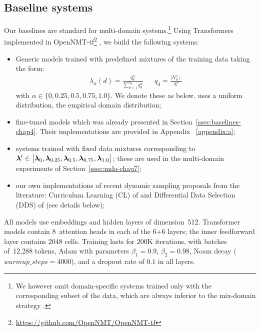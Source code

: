 \subsection{Baseline systems \label{ssec:baseline-chap7}}
Our baselines are standard for multi-domain systems.\footnote{We however omit domain-specific systems trained only with the corresponding subset of the data, which are always inferior to the mix-domain strategy \citep{Britz17effective}.} Using Transformers implemented in OpenNMT-tf\footnote{\url{https://github.com/OpenNMT/OpenNMT-tf}} \citep{Klein17opennmt}, we build the following systems:

\begin{itemize}
\itemsep0em 
\item Generic models trained with predefined mixtures of the training data taking the form:
\begin{align} \label{mixture:trn-chap7}
\lambda_{\alpha}(d) = \frac{q_d^{\alpha}}{\displaystyle{\mathop{\sum}_{d=1}^{n_d}q_d^{\alpha}}} &&
q_d = \frac{\mid N^{s}_d \mid}{\displaystyle{N^{s}}} %
\end{align}
with $\alpha \in \{0,0.25,0.5,0.75,1.0\}$. We denote these as  below.  uses a uniform distribution,  the empirical domain distribution;
\item fine-tuned models \citep{Luong15stanford,Freitag16fast} which was already presented in Section~\ref{ssec:baselines-chap4}. Their implementations are provided in Appendix ~\ref{appendix:a};
\item systems trained with fixed data mixtures corresponding to $\bm{\lambda}^l \in \big[ \bm{\lambda}_0, \bm{\lambda}_{0.25}, \bm{\lambda}_{0.5}, \bm{\lambda}_{0.75}, \bm{\lambda}_{1.0}\big]$; these are used in the multi-domain experiments of Section~\ref{ssec:mda-chap7};
\item  our own implementations of recent dynamic sampling proposals from the literature: Curriculum Learning (CL) of \citet{Zhang19curriculum} and Differential Data Selection (DDS) of \citet{Wang20balancing} (see details below);
\end{itemize}

All models use embeddings and hidden layers of dimension~512. Transformer models contain 8~attention heads in each of the 6+6 layers; the inner feedforward layer contains 2048 cells. Training lasts for 200K iterations, with batches of~12,288 tokens, Adam with parameters $\beta_1=0.9$, $\beta_2= 0.98$, Noam decay ($warmup\_steps=4000$), and a dropout rate of $0.1$ in all layers.


